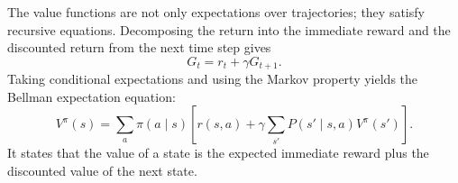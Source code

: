 The value functions are not only expectations over trajectories; they satisfy
recursive equations. Decomposing the return into the immediate reward and the
discounted return from the next time step gives
\begin{equation}
    G_t=r_t+\gamma G_{t+1}.
    \label{eq:rl-return-recursion}
\end{equation}
Taking conditional expectations and using the Markov property yields the
Bellman expectation equation:
\begin{equation}
    V^\pi(s)
    =\sum_a\pi(a\mid s)
    \left[r(s,a)+\gamma\sum_{s'}P(s'\mid s,a)V^\pi(s')\right].
    \label{eq:rl-bellman-expectation}
\end{equation}
It states that the value of a state is the expected immediate reward plus the
discounted value of the next state.

